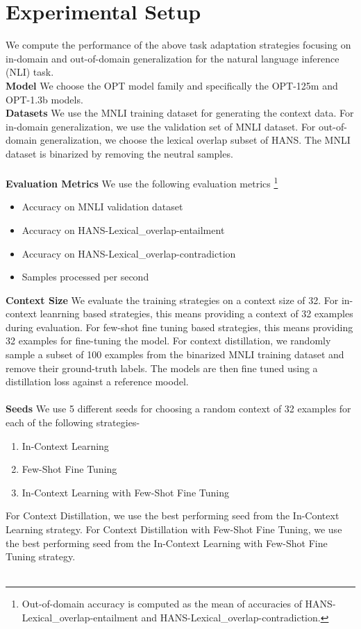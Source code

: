 \documentclass[10pt,twocolumn,letterpaper]{article}
\begin{document}
\section{Experimental Setup}
We compute the performance of the above task adaptation strategies focusing on in-domain and out-of-domain generalization for the natural language inference (NLI) task.\\
\textbf{Model} We choose the OPT model family and specifically the OPT-125m and OPT-1.3b models.\\
\textbf{Datasets} We use the MNLI training dataset for generating the context data. For in-domain generalization, we use the validation set of MNLI dataset. For out-of-domain generalization, we choose the lexical overlap subset of HANS. The MNLI dataset is binarized by removing the neutral samples.\\\\
\textbf{Evaluation Metrics} We use the following evaluation metrics
\footnote{Out-of-domain accuracy is computed as the mean of accuracies of HANS-Lexical\_overlap-entailment and HANS-Lexical\_overlap-contradiction.}
\begin{itemize}
    \item Accuracy on MNLI validation dataset
    \item Accuracy on HANS-Lexical\_overlap-entailment
    \item Accuracy on HANS-Lexical\_overlap-contradiction
    \item Samples processed per second
\end{itemize}
\textbf{Context Size} We evaluate the training strategies on a context size of 32. For in-context leanrning based strategies, this means providing a context of 32 examples during evaluation. For few-shot fine tuning based strategies, this means providing 32 examples for fine-tuning the model. For context distillation, we randomly sample a subset of 100 examples from the binarized MNLI training dataset and remove their ground-truth labels. The models are then fine tuned using a distillation loss against a reference moodel.\\\\
\textbf{Seeds} We use 5 different seeds for choosing a random context of 32 examples for each of the following strategies-
\begin{enumerate}
    \item In-Context Learning
    \item Few-Shot Fine Tuning
    \item In-Context Learning with Few-Shot Fine Tuning
\end{enumerate}
For Context Distillation, we use the best performing seed from the In-Context Learning strategy. For Context Distillation with Few-Shot Fine Tuning, we use the best performing seed from the In-Context Learning with Few-Shot Fine Tuning strategy.\\\\
\end{document}
